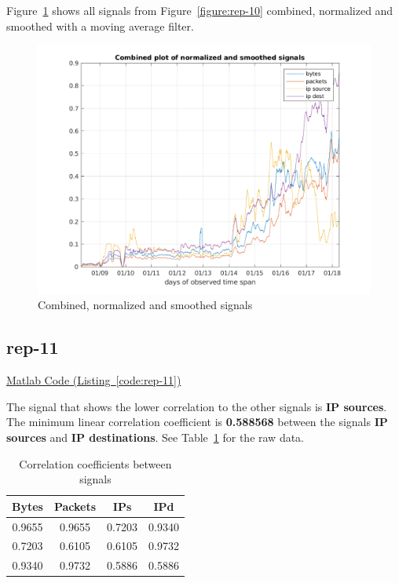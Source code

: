 \documentclass{article}
\newcommand{\codelink}[1]{%
    \hyperref[#1]{Matlab Code (Listing~\ref{#1})}%
}
\begin{document}
Figure~\ref{figure:rep-10-optional} shows all signals from Figure~\ref{figure:rep-10} combined, normalized
and smoothed with a moving average filter.

\begin{figure}[h]
    \centering
    \includegraphics[width=\textwidth]{../exercise-3/plots/rep_10_optional}
    \caption{\label{figure:rep-10-optional} Combined, normalized and smoothed signals}
\end{figure}

\subsection{rep-11}

\codelink{code:rep-11}

The signal that shows the lower correlation to the other signals is \textbf{IP sources}. The minimum
linear correlation coefficient is \textbf{0.588568} between the signals \textbf{IP sources} and
\textbf{IP destinations}. See Table~\ref{table:rep-11} for the raw data.


\begin{table}[h]
    \centering
    \begin{tabular}{c|c|c|c}
        Bytes & Packets & IPs & IPd \\
        \hline
        0.9655 &   0.9655 &   0.7203 &   0.9340 \\
        0.7203 &   0.6105 &   0.6105 &   0.9732 \\
        0.9340 &   0.9732 &   0.5886 &   0.5886 \\
    \end{tabular}
    \caption{\label{table:rep-11} Correlation coefficients between signals}
\end{table}
\end{document}

